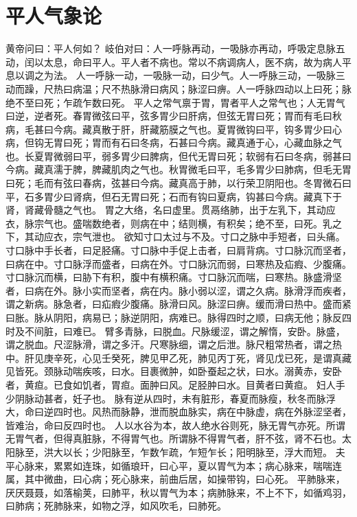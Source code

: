 \documentclass[a4paper,12pt,UTF8,twoside]{ctexbook}
\begin{document}
\chapter{平人气象论}
黄帝问曰：平人何如？
岐伯对曰：人一呼脉再动，一吸脉亦再动，呼吸定息脉五动，闰以太息，命曰平人。平人者不病也。常以不病调病人，医不病，故为病人平息以调之为法。
人一呼脉一动，一吸脉一动，曰少气。人一呼脉三动，一吸脉三动而躁，尺热曰病温；尺不热脉滑曰病风；脉涩曰痹。人一呼脉四动以上曰死；脉绝不至曰死；乍疏乍数曰死。
平人之常气禀于胃，胃者平人之常气也；人无胃气曰逆，逆者死。春胃微弦曰平，弦多胃少曰肝病，但弦无胃曰死；胃而有毛曰秋病，毛甚曰今病。藏真散于肝，肝藏筋膜之气也。夏胃微钩曰平，钩多胃少曰心病，但钩无胃曰死；胃而有石曰冬病，石甚曰今病。藏真通于心，心藏血脉之气也。长夏胃微弱曰平，弱多胃少曰脾病，但代无胃曰死；软弱有石曰冬病，弱甚曰今病。藏真濡于脾，脾藏肌肉之气也。秋胃微毛曰平，毛多胃少曰肺病，但毛无胃曰死；毛而有弦曰春病，弦甚曰今病。藏真高于肺，以行荣卫阴阳也。冬胃微石曰平，石多胃少曰肾病，但石无胃曰死；石而有钩曰夏病，钩甚曰今病。藏真下于肾，肾藏骨髓之气也。
胃之大络，名曰虚里。贯鬲络肺，出于左乳下，其动应衣，脉宗气也。盛喘数绝者，则病在中；结则横，有积矣；绝不至，曰死。乳之下，其动应衣，宗气泄也。
欲知寸口太过与不及。寸口之脉中手短者，曰头痛。寸口脉中手长者，曰足胫痛。寸口脉中手促上击者，曰肩背病。寸口脉沉而坚者，曰病在中。寸口脉浮而盛者，曰病在外。寸口脉沉而弱，曰寒热及疝瘕、少腹痛。寸口脉沉而横，曰胁下有积，腹中有横积痛。寸口脉沉而喘，曰寒热。脉盛滑坚者，曰病在外。脉小实而坚者，病在内。脉小弱以涩，谓之久病。脉滑浮而疾者，谓之新病。脉急者，曰疝瘕少腹痛。脉滑曰风。脉涩曰痹。缓而滑曰热中。盛而紧曰胀。脉从阴阳，病易已；脉逆阴阳，病难已。脉得四时之顺，曰病无他；脉反四时及不间脏，曰难已。
臂多青脉，曰脱血。尺脉缓涩，谓之解惰，安卧。脉盛，谓之脱血。尺涩脉滑，谓之多汗。尺寒脉细，谓之后泄。脉尺粗常热者，谓之热中。肝见庚辛死，心见壬癸死，脾见甲乙死，肺见丙丁死，肾见戊已死，是谓真藏见皆死。颈脉动喘疾咳，曰水。目裹微肿，如卧蚕起之状，曰水。溺黄赤，安卧者，黄疸。已食如饥者，胃疸。面肿曰风。足胫肿曰水。目黄者曰黄疸。
妇人手少阴脉动甚者，妊子也。
脉有逆从四时，未有脏形，春夏而脉瘦，秋冬而脉浮大，命曰逆四时也。风热而脉静，泄而脱血脉实，病在中脉虚，病在外脉涩坚者，皆难治，命曰反四时也。
人以水谷为本，故人绝水谷则死，脉无胃气亦死。所谓无胃气者，但得真脏脉，不得胃气也。所谓脉不得胃气者，肝不弦，肾不石也。太阳脉至，洪大以长；少阳脉至，乍数乍疏，乍短乍长；阳明脉至，浮大而短。
夫平心脉来，累累如连珠，如循琅玕，曰心平，夏以胃气为本；病心脉来，喘喘连属，其中微曲，曰心病；死心脉来，前曲后居，如操带钩，曰心死。
平肺脉来，厌厌聂聂，如落榆荚，曰肺平，秋以胃气为本；病肺脉来，不上不下，如循鸡羽，曰肺病；死肺脉来，如物之浮，如风吹毛，曰肺死。
\end{document}

